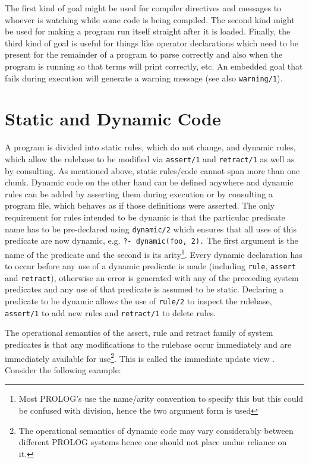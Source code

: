 \noindent
The first kind of goal might be used
for compiler directives and messages to whoever is watching while some code is
being compiled. The second kind might be used for making a program run itself
straight after it is loaded. Finally, the third kind of goal is useful for
things like operator declarations which need to be present for the remainder
of a program to parse correctly and also when the program is running so that
terms will print correctly, etc.
\chgbarbegin
An embedded goal that fails during execution will generate
a warning message (see also {\tt warning/1}).
\chgbarend

\section{Static and Dynamic Code}
\label{dynamic-section}

A \CLPR{} program is divided into static rules, which do not change,
and dynamic rules, which allow the rulebase to be modified via {\tt assert/1}
and {\tt retract/1} as well as by 
consulting.
As mentioned above, static rules/code cannot span more than one chunk.
\chgbarbegin
Dynamic code on the other hand can be defined anywhere and dynamic
rules can be added by asserting them during execution
or by consulting a program file, which behaves as if those definitions
were asserted.
The only requirement for rules intended to be dynamic is that the
particular predicate name has
to be pre-declared using {\tt dynamic/2} which ensures that
all uses of this predicate are now dynamic, e.g. {\tt ?- dynamic(foo, 2).}
The first argument is the name of the predicate and the second is its
arity\footnote{Most PROLOG's use the name/arity convention to specify
this but this could be confused with division, hence the two argument
form is used}.
Every dynamic declaration has to occur before any use of a dynamic predicate
is made (including {\tt rule}, {\tt assert} and {\tt retract}), otherwise
an error is generated with any of the preceeding system predicates and
any use of that predicate is assumed to be static.
\chgbarend
Declaring a predicate to be dynamic allows the use of {\tt rule/2}
to inspect the rulebase,
{\tt assert/1} to add new rules and {\tt retract/1} to delete rules.

The operational semantics of the 
assert, rule and retract family of system
predicates is that any modifications to the rulebase
occur immediately and are immediately available for use\footnote{
The operational semantics of dynamic code may vary considerably
between different PROLOG systems hence one should not place
undue reliance on it.}.
This is called the immediate update view \cite{LINDHOLM87}.
Consider the following example: 

